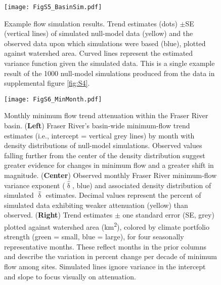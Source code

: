 \documentclass[draft,grl]{agutexSI}
\begin{document}
\begin{figure}[h]
	\centering
	\noindent\texttt{[image: FigS5\_BasinSim.pdf]}
	\caption{Example flow simulation results. Trend estimates (dots) $\pm$SE (vertical lines) of simulated null-model data (yellow) and the observed data upon which simulations were based (blue), plotted against watershed area. Curved lines represent the estimated variance function given the simulated data. This is a single example result of the 1000 null-model simulations produced from the data in supplemental figure \ref{fig:S4}.}
	\label{fig:S5}
\end{figure}

\begin{figure}[h]
	\centering
	\noindent\texttt{[image: FigS6\_MinMonth.pdf]}
	\caption{Monthly minimum flow trend attenuation within the Fraser River basin. (\textbf{Left}) Fraser River's basin-wide minimum-flow trend estimates (i.e., intercept = vertical grey lines) by month with density distributions of null-model simulations. Observed values falling further from the center of the density distribution suggest greater evidence for changes in minimum flow and a greater shift in magnitude. (\textbf{Center}) Observed monthly Fraser River minimum-flow variance exponent ($\hat{\updelta}$, blue) and associated density distribution of simulated $\hat{\updelta}$ estimates. Decimal values represent the percent of simulated data exhibiting weaker attenuation (yellow) than observed. (\textbf{Right}) Trend estimates $\pm$ one standard error (SE, grey) plotted against watershed area (km\textsuperscript{2}), colored by climate portfolio strength (green = small, blue = large), for four seasonally representative months. These reflect months in the prior columns and describe the variation in percent change per decade of minimum flow among sites. Simulated lines ignore variance in the intercept and slope to focus visually on attenuation.}
	\label{fig:S6}
\end{figure}
\end{document}
